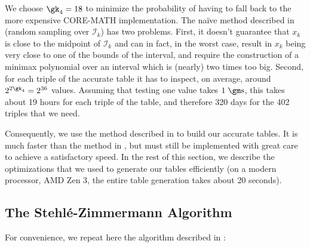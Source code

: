 \documentclass[10pt, a4paper, twoside]{basestyle}
\begin{document}
We choose $\gk_4 = 18$ to minimize the probability of having to fall back to the more expensive CORE-MATH implementation.  The naïve method described in \cite{Gal1986} (random sampling over $\mathscr{I}_k$) has two problems.  First, it doesn't guarantee that $x_k$ is close to the midpoint of $\mathscr{I}_k$ and can in fact, in the worst case, result in $x_k$ being very close to one of the bounds of the interval, and require the construction of a minimax polynomial over an interval which is (nearly) two times too big.  Second, for each triple of the accurate table it has to inspect, on average, around $2^{2 \gk_4} = 2^{36}$ values.  Assuming that testing one value takes $1 \; \gm \text{s}$, this takes about 19 hours for each triple of the table, and therefore 320 days for the 402 triples that we need.

Consequently, we use the method described in \cite{StehléZimmermann2005} to build our accurate tables.  It is much faster than the method in \cite{Gal1986}, but must still be implemented with great care to achieve a satisfactory speed.  In the rest of this section, we describe the optimizations that we used to generate our tables efficiently (on a modern processor, AMD Zen 3, the entire table generation takes about 20 seconds).

\subsection*{The Stehlé-Zimmermann Algorithm}

For convenience, we repeat here the algorithm described in \cite{StehléZimmermann2005}:
\end{document}
